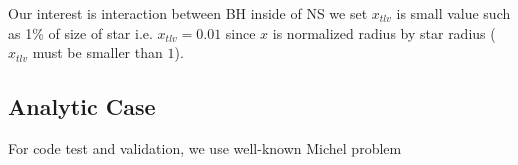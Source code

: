 \documentclass[prd]{revtex4}
\begin{document}
Our interest is interaction between BH inside of NS we set $x_{tlv}$ is small value such as 1\% of size of star i.e. $x_{tlv} = 0.01$ since $x$ is normalized radius by star radius ($x_{tlv}$ must be smaller than $1$).

\subsection{Analytic Case}

For code test and validation, we use well-known Michel problem
\end{document}
